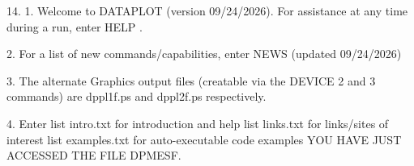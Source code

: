 14.
1. Welcome to DATAPLOT (version 09/24/2026).  For assistance at
   any time during a run, enter HELP   .

2. For a list of new commands/capabilities,
   enter NEWS  (updated 09/24/2026)

3. The alternate Graphics output files (creatable
   via the DEVICE 2 and 3 commands) are
   dppl1f.ps and dppl2f.ps respectively.

4. Enter  list intro.txt     for introduction and help
          list links.txt     for links/sites of interest
          list examples.txt  for auto-executable code examples
YOU HAVE JUST ACCESSED THE FILE DPMESF.
